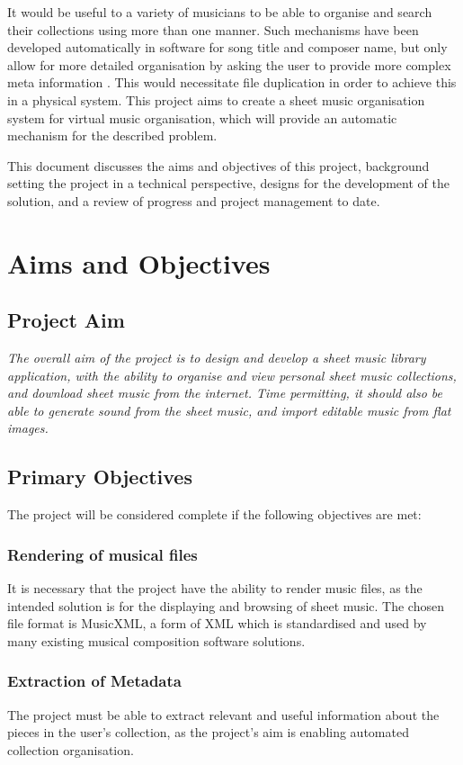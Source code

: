 It would be useful to a variety of musicians to be able to organise and search their collections using more than one manner. Such mechanisms have been developed automatically in software for song title and composer name, but only allow for more detailed organisation by asking the user to provide more complex meta information \parencite{calypso}. This would necessitate file duplication in order to achieve this in a physical system. This project aims to create a sheet music organisation system for virtual music organisation, which will provide an automatic mechanism for the described problem.

This document discusses the aims and objectives of this project, background setting the project in a technical perspective, designs for the development of the solution, and a review of progress and project management to date. 
\pagebreak
\section{Aims and Objectives}
\subsection{Project Aim}
\begin{center}
\textit{The overall aim of the project is to design and develop a sheet music library application, with the ability to organise and view personal sheet music collections, and download sheet music from the internet. Time permitting, it should also be able to generate sound from the sheet music, and import editable music from flat images.}
\end{center}
\subsection{Primary Objectives}
The project will be considered complete if the following objectives are met:
\subsubsection{Rendering of musical files}
It is necessary that the project have the ability to render music files, as the intended solution is for the displaying and browsing of sheet music. The chosen file format is MusicXML, a form of XML which is standardised and used by many existing musical composition software solutions.
\subsubsection{Extraction of Metadata}
The project must be able to extract relevant and useful information about the pieces in the user's collection, as the project's aim is enabling automated collection organisation. 
